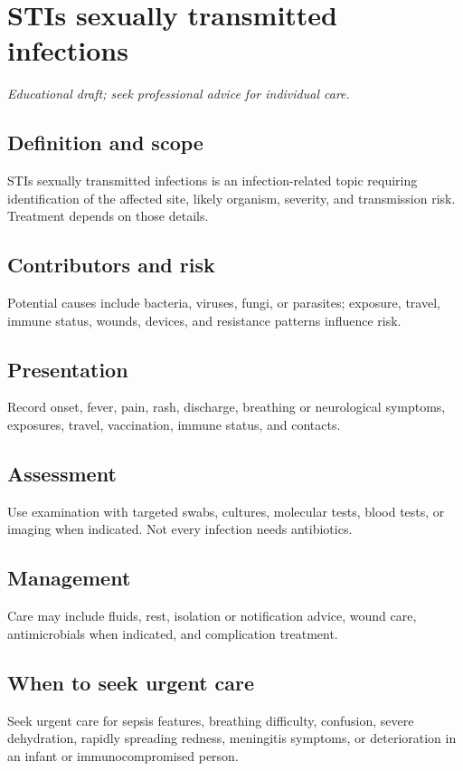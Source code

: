\chapter{STIs sexually transmitted infections}
\medskip
\noindent\textit{Educational draft; seek professional advice for individual care.}

\section*{Definition and scope}
STIs sexually transmitted infections is an infection-related topic requiring identification of the affected site, likely organism, severity, and transmission risk. Treatment depends on those details.

\section*{Contributors and risk}
Potential causes include bacteria, viruses, fungi, or parasites; exposure, travel, immune status, wounds, devices, and resistance patterns influence risk.

\section*{Presentation}
Record onset, fever, pain, rash, discharge, breathing or neurological symptoms, exposures, travel, vaccination, immune status, and contacts.

\section*{Assessment}
Use examination with targeted swabs, cultures, molecular tests, blood tests, or imaging when indicated. Not every infection needs antibiotics.

\section*{Management}
Care may include fluids, rest, isolation or notification advice, wound care, antimicrobials when indicated, and complication treatment.

\section*{When to seek urgent care}
Seek urgent care for sepsis features, breathing difficulty, confusion, severe dehydration, rapidly spreading redness, meningitis symptoms, or deterioration in an infant or immunocompromised person.

